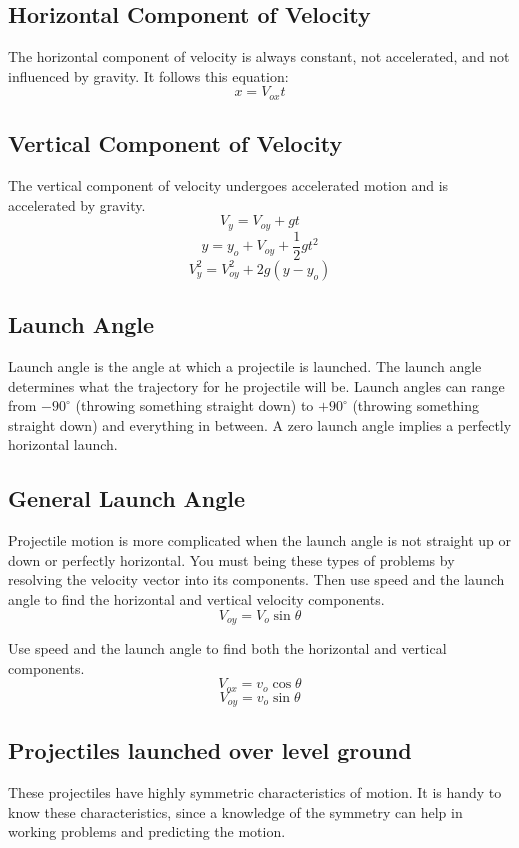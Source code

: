 \subsection{Horizontal Component of Velocity}
The horizontal component of velocity is always constant, not accelerated, and not influenced by gravity. It follows this equation: \[x=V_{ox}t\]
	
\subsection{Vertical Component of Velocity}
The vertical component of velocity undergoes accelerated motion and is accelerated by gravity.
\[V_y=V_{oy}+gt\]
\[y=y_o+V_{oy}+\frac{1}{2}gt^2\]
\[V_y^2=V_{oy}^2+2g(y-y_o)\]
	
\subsection{Launch Angle}
Launch angle is the angle at which a projectile is launched. The launch angle determines what the trajectory for he projectile will be. Launch angles can range from $-90^\circ$ (throwing something straight down) to $+90^\circ$ (throwing something straight down) and everything in between. A zero launch angle implies a perfectly horizontal launch.
	
\subsection{General Launch Angle}
Projectile motion is more complicated when the launch angle is not straight up or down or perfectly horizontal. You must being these types of problems by resolving the velocity vector into its components. Then use speed and the launch angle to find the horizontal and vertical velocity components. \[V_{oy}=V_o\sin\theta\]
	
Use speed and the launch angle to find both the horizontal and vertical components. 
\[V_{ox}=v_o\cos\theta\]
\[V_{oy}=v_o\sin\theta\]
	
\subsection{Projectiles launched over level ground}
These projectiles have highly symmetric characteristics of motion. It is handy to know these characteristics, since a knowledge of the symmetry can help in working problems and predicting the motion.
	
